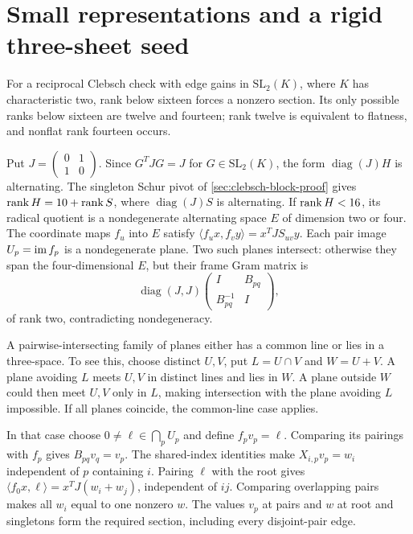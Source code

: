 \section{Small representations and a rigid three-sheet seed}
\label{sec:clebsch-small}

\begin{theorem}
\label{thm:clebsch-plane}
\notformalized
For a reciprocal Clebsch check with edge gains in $\mathrm{SL}_2(K)$,
where $K$ has characteristic two, rank below sixteen forces a nonzero
section. Its only possible ranks below sixteen are twelve and fourteen;
rank twelve is equivalent to flatness, and nonflat rank fourteen occurs.
\end{theorem}
\begin{informalproof}
Put $J=\left(\begin{smallmatrix}0&1\\1&0\end{smallmatrix}\right)$.
Since $G^TJG=J$ for $G\in\mathrm{SL}_2(K)$, the form
$\operatorname{diag}(J)H$ is alternating. The singleton Schur pivot
of \cref{sec:clebsch-block-proof} gives $\operatorname{rank} H=10+\operatorname{rank} S$,
where $\operatorname{diag}(J)S$ is alternating. If $\operatorname{rank} H<16$,
its radical quotient is a nondegenerate alternating space $E$ of
dimension two or four. The coordinate maps $f_u$ into $E$ satisfy
$\langle f_ux,f_vy\rangle=x^TJS_{uv}y$.
Each pair image $U_p=\operatorname{im} f_p$ is a nondegenerate plane. Two such
planes intersect: otherwise they span the four-dimensional $E$,
but their frame Gram matrix is
\[
 \operatorname{diag}(J,J)
 \begin{pmatrix}I&B_{pq}\\B_{pq}^{-1}&I\end{pmatrix},
\]
of rank two, contradicting nondegeneracy.

A pairwise-intersecting family of planes either has a common line
or lies in a three-space. To see this, choose distinct $U,V$, put
$L=U\cap V$ and $W=U+V$. A plane avoiding $L$ meets $U,V$ in
distinct lines and lies in $W$. A plane outside $W$ could then meet
$U,V$ only in $L$, making intersection with the plane avoiding $L$
impossible. If all planes coincide, the common-line case applies.

In that case choose $0\ne\ell\in\bigcap_pU_p$ and define
$f_pv_p=\ell$. Comparing its pairings with $f_p$ gives
$B_{pq}v_q=v_p$. The shared-index identities make
$X_{i,p}v_p=w_i$ independent of $p$ containing $i$.
Pairing $\ell$ with the root gives
$\langle f_0x,\ell\rangle=x^TJ(w_i+w_j)$, independent of $ij$.
Comparing overlapping pairs makes all $w_i$ equal to one nonzero
$w$. The values $v_p$ at pairs and $w$ at root and singletons form
the required section, including every disjoint-pair edge.


\end{informalproof}
